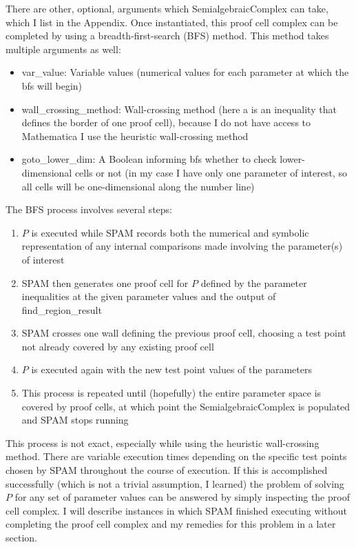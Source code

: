 \documentclass{article}
\begin{document}
There are other, optional, arguments which SemialgebraicComplex can take, which I list in the Appendix. Once instantiated, this proof cell complex can be completed by using a breadth-first-search (BFS) method. This method takes multiple arguments as well:

\begin{itemize}
    \item var\_value: Variable values (numerical values for each parameter at which the bfs will begin)
    \item wall\_crossing\_method: Wall-crossing method (here a  is an inequality that defines the border of one proof cell), because I do not have access to Mathematica I use the heuristic wall-crossing method
    \item goto\_lower\_dim: A Boolean informing bfs whether to check lower-dimensional cells or not (in my case I have only one parameter of interest, so all cells will be one-dimensional along the number line)
\end{itemize}

The BFS process involves several steps:
\begin{enumerate}
    \item $P$ is executed while SPAM records both the numerical and symbolic representation of any internal comparisons made involving the parameter(s) of interest
    \item SPAM then generates one proof cell for $P$ defined by the parameter inequalities at the given parameter values and the output of find\_region\_result
    \item SPAM crosses one wall defining the previous proof cell, choosing a test point not already covered by any existing proof cell
    \item $P$ is executed again with the new test point values of the parameters
    \item This process is repeated until (hopefully) the entire parameter space is covered by proof cells, at which point the SemialgebraicComplex is populated and SPAM stops running
\end{enumerate}

This process is not exact, especially while using the heuristic wall-crossing method. There are variable execution times depending on the specific test points chosen by SPAM throughout the course of execution. If this is accomplished successfully (which is not a trivial assumption, I learned) the problem of solving $P$ for any set of parameter values can be answered by simply inspecting the proof cell complex. I will describe instances in which SPAM finished executing without completing the proof cell complex and my remedies for this problem in a later section.
\end{document}
